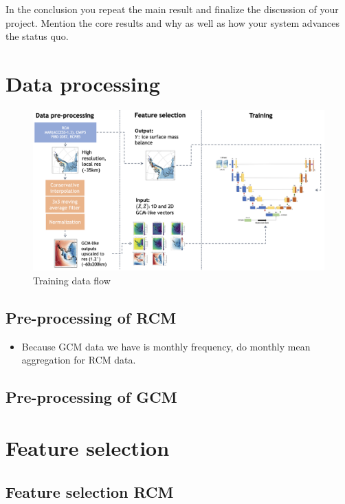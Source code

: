 \documentclass[a4paper,11pt,oneside]{report}
\begin{document}
In the conclusion you repeat the main result and finalize the discussion of
your project. Mention the core results and why as well as how your system
advances the status quo.

\cleardoublepage
{}
{}
\printbibliography

\appendix
\chapter{Data processing}
\begin{figure}[!t]
  \centering
  \includegraphics[width=\columnwidth]{images/data-flow.png}
  \caption []{\small Training data flow}
  \label{fig:training-data-flow}
\end{figure}
\section{Pre-processing of RCM}
\begin{itemize}
    \item  Because GCM data we have is monthly frequency, do monthly mean aggregation for RCM data.

\end{itemize}
\section{Pre-processing of GCM}
\chapter{Feature selection}
\section{Feature selection RCM}
\end{document}

